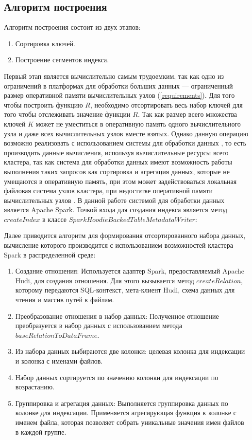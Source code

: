 \subsection{Алгоритм построения}\label{build}

Алгоритм построения состоит из двух этапов:

\begin{enumerate}
    \item {Сортировка ключей}.
    \item {Построение сегментов индекса}.
\end{enumerate}

Первый этап является вычислительно самым трудоемким, так как одно из ограничений в платформах для обработки больших данных --- ограниченный размер оперативной памяти вычислительных узлов (\ref{requirements}). Для того чтобы построить функцию $R$, необходимо отсортировать весь набор ключей для того чтобы отслеживать значение функции $R$. Так как размер всего множества ключей $K$ может не уместиться в оперативную память одного вычислительного узла и даже всех вычислительных узлов вместе взятых. Однако данную операцию возможно реализовать с использованием системы для обработки данных , то есть производить данные вычисления, используя вычислительные ресурсы всего кластера, так как система для обработки данных имеют возможность работы выполнения таких запросов как сортировка и агрегация данных, которые не умещаются в оперативную память, при этом может задействоваться локальная файловая система узлов кластера, при недостатке оперативной памяти вычислительных узлов . В данной работе системой для обработки данных является Apache Spark. Точкой входа для создания индекса является метод $createIndex$ в классе $SparkHoodieBackedTableMetadataWriter$:

Далее приводится алгоритм для формирования отсортированного набора данных, вычисление которого производится с использованием возможностей кластера Spark в распределенной среде:

\begin{enumerate}
    \item Создание отношения: Используется адаптер Spark, предоставляемый Apache Hudi, для создания отношения. Для этого вызывается метод $createRelation$, которому передаются SQL-контекст, мета-клиент Hudi, схема данных для чтения и массив путей к файлам.
    \item Преобразование отношения в набор данных: Полученное отношение преобразуется в набор данных с использованием метода $baseRelationToDataFrame$.
    \item Из набора данных выбираются две колонки: целевая колонка для индексации и колонка с именами файлов.
    \item Набор данных сортируется по значению колонки для индексации по возрастанию.
    \item Группировка и агрегация данных: Выполняется группировка данных по колонке для индексации. Применяется агрегирующая функция к колонке с именем файла, которая позволяет собрать уникальные значения имен файлов в каждой группе.
\end{enumerate}


